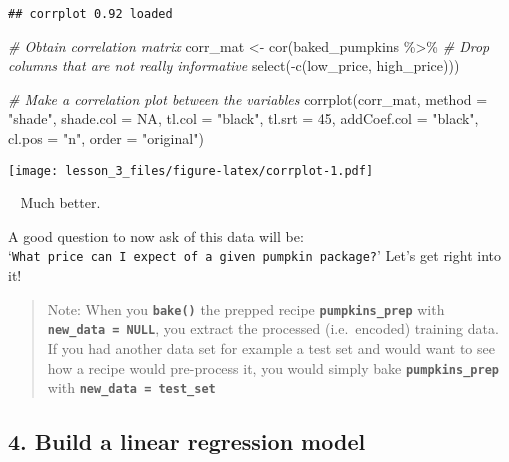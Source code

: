 \documentclass[
]{article}
\newenvironment{Shaded}{\begin{snugshade}}{\end{snugshade}}
\newcommand{\AttributeTok}[1]{\textcolor[rgb]{0.77,0.63,0.00}{#1}}
\newcommand{\CommentTok}[1]{\textcolor[rgb]{0.56,0.35,0.01}{\textit{#1}}}
\newcommand{\ConstantTok}[1]{\textcolor[rgb]{0.00,0.00,0.00}{#1}}
\newcommand{\DecValTok}[1]{\textcolor[rgb]{0.00,0.00,0.81}{#1}}
\newcommand{\FunctionTok}[1]{\textcolor[rgb]{0.00,0.00,0.00}{#1}}
\newcommand{\NormalTok}[1]{#1}
\newcommand{\OtherTok}[1]{\textcolor[rgb]{0.56,0.35,0.01}{#1}}
\newcommand{\SpecialCharTok}[1]{\textcolor[rgb]{0.00,0.00,0.00}{#1}}
\newcommand{\StringTok}[1]{\textcolor[rgb]{0.31,0.60,0.02}{#1}}
\begin{document}
\begin{verbatim}
## corrplot 0.92 loaded
\end{verbatim}

\begin{Shaded}
\begin{Highlighting}[]
\CommentTok{\# Obtain correlation matrix}
\NormalTok{corr\_mat }\OtherTok{\textless{}{-}} \FunctionTok{cor}\NormalTok{(baked\_pumpkins }\SpecialCharTok{\%\textgreater{}\%} 
                  \CommentTok{\# Drop columns that are not really informative}
                  \FunctionTok{select}\NormalTok{(}\SpecialCharTok{{-}}\FunctionTok{c}\NormalTok{(low\_price, high\_price)))}

\CommentTok{\# Make a correlation plot between the variables}
\FunctionTok{corrplot}\NormalTok{(corr\_mat, }\AttributeTok{method =} \StringTok{"shade"}\NormalTok{, }\AttributeTok{shade.col =} \ConstantTok{NA}\NormalTok{, }\AttributeTok{tl.col =} \StringTok{"black"}\NormalTok{, }\AttributeTok{tl.srt =} \DecValTok{45}\NormalTok{, }\AttributeTok{addCoef.col =} \StringTok{"black"}\NormalTok{, }\AttributeTok{cl.pos =} \StringTok{"n"}\NormalTok{, }\AttributeTok{order =} \StringTok{"original"}\NormalTok{)}
\end{Highlighting}
\end{Shaded}

\texttt{[image: lesson\_3\_files/figure-latex/corrplot-1.pdf]}

🤩🤩 Much better.

A good question to now ask of this data will be:
`\texttt{What\ price\ can\ I\ expect\ of\ a\ given\ pumpkin\ package?}'
Let's get right into it!

\begin{quote}
Note: When you \textbf{\texttt{bake()}} the prepped recipe
\textbf{\texttt{pumpkins\_prep}} with
\textbf{\texttt{new\_data\ =\ NULL}}, you extract the processed
(i.e.~encoded) training data. If you had another data set for example a
test set and would want to see how a recipe would pre-process it, you
would simply bake \textbf{\texttt{pumpkins\_prep}} with
\textbf{\texttt{new\_data\ =\ test\_set}}
\end{quote}

\hypertarget{build-a-linear-regression-model}{%
\subsection{4. Build a linear regression
model}\label{build-a-linear-regression-model}}
\end{document}

